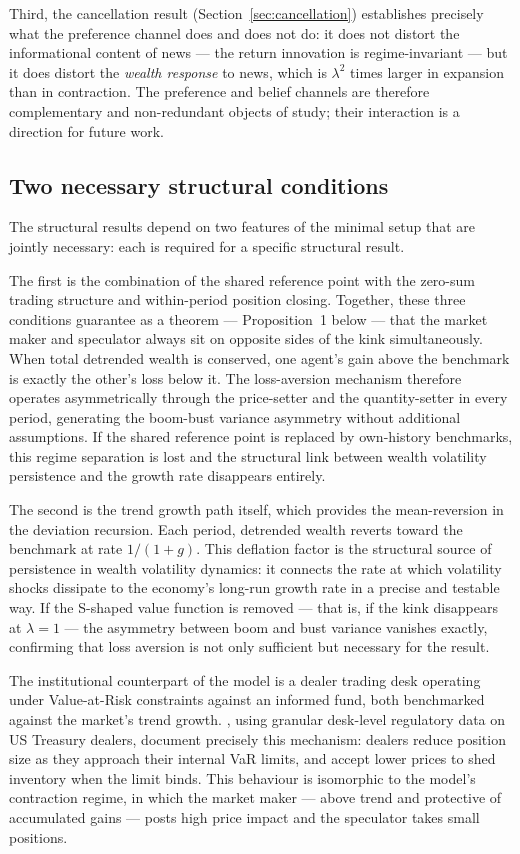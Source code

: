 \documentclass[12pt,a4paper]{article}
\theoremstyle{definition}
\begin{document}
Third, the cancellation result (Section~\ref{sec:cancellation}) establishes
precisely what the preference channel does and does not do: it does not
distort the informational content of news --- the return innovation is
regime-invariant --- but it does distort the \emph{wealth response} to
news, which is $\lambda^2$ times larger in expansion than in contraction.
The preference and belief channels are therefore complementary and
non-redundant objects of study; their interaction is a direction for
future work.

\subsection{Two necessary structural conditions}
\label{sec:necessary_conditions}

The structural results depend on two features of the minimal setup that are
jointly necessary: each is required for a specific structural result.

The first is the combination of the shared reference point with the zero-sum
trading structure and within-period position closing. Together, these three
conditions guarantee as a theorem --- Proposition~1 below --- that the market
maker and speculator always sit on opposite sides of the kink simultaneously.
When total detrended wealth is conserved, one agent's gain above the benchmark
is exactly the other's loss below it. The loss-aversion mechanism therefore
operates asymmetrically through the price-setter and the quantity-setter in
every period, generating the boom-bust variance asymmetry without additional
assumptions. If the shared reference point is replaced by own-history
benchmarks, this regime separation is lost and the structural link between
wealth volatility persistence and the growth rate disappears entirely.

The second is the trend growth path itself, which provides the
mean-reversion in the deviation recursion. Each period, detrended wealth
reverts toward the benchmark at rate $1/(1+g)$. This deflation factor is
the structural source of persistence in wealth volatility dynamics: it
connects the rate at which volatility shocks dissipate to the economy's
long-run growth rate in a precise and testable way. If the S-shaped value
function is removed --- that is, if the kink disappears at $\lambda = 1$ ---
the asymmetry between boom and bust variance vanishes exactly, confirming
that loss aversion is not only sufficient but necessary for the result.

The institutional counterpart of the model is a dealer trading desk operating
under Value-at-Risk constraints against an informed fund, both benchmarked
against the market's trend growth. \citet{li2025}, using
granular desk-level regulatory data on US Treasury dealers, document precisely
this mechanism: dealers reduce position size as they approach their internal
VaR limits, and accept lower prices to shed inventory when the limit binds.
This behaviour is isomorphic to the model's contraction regime, in which the
market maker --- above trend and protective of accumulated gains --- posts
high price impact and the speculator takes small positions.
\end{document}
